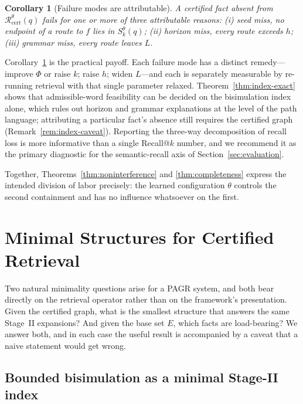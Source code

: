 \documentclass[11pt]{article}
\newtheorem{corollary}[definition]{Corollary}
\begin{document}
\begin{corollary}[Failure modes are attributable]
\label{cor:attributable}
A certified fact absent from $\mathcal{R}^{\theta}_{\mathrm{cert}}(q)$ fails for one or more of three attributable reasons: (i) \emph{seed miss}, no endpoint of a route to $f$ lies in $S_k^{\theta}(q)$; (ii) \emph{horizon miss}, every route exceeds $h$; (iii) \emph{grammar miss}, every route leaves $L$.
\end{corollary}

Corollary~\ref{cor:attributable} is the practical payoff. Each failure mode has a distinct remedy---improve $\Phi$ or raise $k$; raise $h$; widen $L$---and each is separately measurable by re-running retrieval with that single parameter relaxed. Theorem~\ref{thm:index-exact} shows that admissible-word feasibility can be decided on the bisimulation index alone, which rules out horizon and grammar explanations at the level of the path language; attributing a particular fact's absence still requires the certified graph (Remark~\ref{rem:index-caveat}). Reporting the three-way decomposition of recall loss is more informative than a single Recall@$k$ number, and we recommend it as the primary diagnostic for the semantic-recall axis of Section~\ref{sec:evaluation}.

Together, Theorems~\ref{thm:noninterference} and \ref{thm:completeness} express the intended division of labor precisely: the learned configuration $\theta$ controls the second containment and has no influence whatsoever on the first.

\section{Minimal Structures for Certified Retrieval}
\label{sec:minimal}

Two natural minimality questions arise for a PAGR system, and both bear directly on the retrieval operator rather than on the framework's presentation. Given the certified graph, what is the smallest structure that answers the same Stage~II expansions? And given the base set $E$, which facts are load-bearing? We answer both, and in each case the useful result is accompanied by a caveat that a naive statement would get wrong.

\subsection{Bounded bisimulation as a minimal Stage-II index}
\label{sec:bisim}
\end{document}
